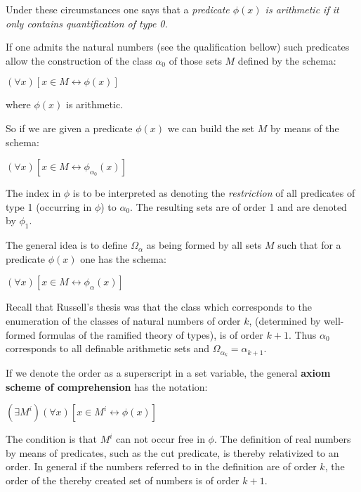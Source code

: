 \documentclass[12pt]{article}
\begin{document}
Under these circumstances one says that a \emph{predicate $\phi (x)$ is arithmetic if it only contains quantification of type 0.}

If one admits the natural numbers (see the qualification bellow) such predicates allow the construction of the class $\alpha_{0}$ of those sets $M$ defined by the schema:

\begin{center}
$(\forall x) [x \in M \leftrightarrow \phi (x)]$
\end{center}
 
where $\phi (x)$ is arithmetic.

So if we are given a predicate $\phi (x)$ we can build the set $M$ by means of the schema:

\begin{center}
$(\forall x) [x \in M \leftrightarrow \phi_{\alpha_{0}} (x)]$
\end{center}

The index in $\phi$ is to be interpreted as denoting the \emph{restriction} of all predicates of type 1 (occurring in $\phi$) to $\alpha_{0}$. The resulting sets are of order 1 and are denoted by $\phi_{1}.$ 

The general idea is to define $\Omega_{\alpha}$ as being formed by all sets $M$ such that for a predicate $\phi (x)$ one has the schema:

\begin{center}
$(\forall x) [x \in M \leftrightarrow \phi_{\alpha} (x)]$
\end{center}

Recall that Russell's thesis was that the class which corresponds to the enumeration of the classes of natural numbers of order $k$, (determined by well-formed formulas of the ramified theory of types), is of order $k+1$. Thus $\alpha_{0}$ corresponds to all definable arithmetic sets and $\Omega_{\alpha_{k}} = \alpha_{k+1}.$
 
If we denote the order as a superscript in a set variable, the general \textbf{axiom scheme of comprehension} has the notation:

\begin{center}
$(\exists M^{i}) (\forall x) [x \in M^{i} \leftrightarrow \phi (x)]$
\end{center}

The condition is that $M^{i}$ can not occur free in $\phi$. The definition of real numbers by means of predicates, such as the cut predicate, is thereby relativized to an order. In general if the numbers referred to in the definition are of order $k$, the order of the thereby created set of numbers is of order $k+1$. 
\end{document}
